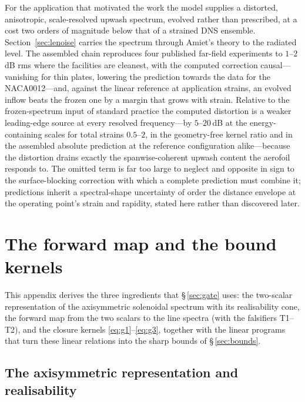 \documentclass[11pt,a4paper]{article}
\begin{document}
For the application that motivated the work the model supplies a
distorted, anisotropic, scale-resolved upwash spectrum, evolved rather than
prescribed, at a cost two orders of magnitude below that of a strained DNS
ensemble. Section~\ref{sec:lenoise} carries the spectrum through Amiet's
theory to the radiated level. The assembled chain reproduces four published far-field experiments to
$1$--$2$\,dB rms where the facilities are cleanest, with the computed
correction causal---vanishing for thin plates, lowering the
prediction towards the data for the NACA0012---and, against the linear
reference at application strains, an evolved inflow beats the frozen
one by a margin that grows with strain. Relative to the
frozen-spectrum input of standard practice the computed distortion is
a weaker leading-edge source at every resolved frequency---by
$5$--$20$\,dB at the energy-containing scales for total strains
$0.5$--$2$, in the geometry-free kernel ratio and in the assembled
absolute prediction at the reference configuration alike---because the
distortion drains exactly the spanwise-coherent upwash content the
aerofoil responds to. The omitted
term is far too large to neglect and opposite in sign to the
surface-blocking correction with which a complete prediction must
combine it; predictions inherit a spectral-shape uncertainty of order
the distance envelope at the operating point's strain and rapidity,
stated here rather than discovered later.

\appendix
\section{The forward map and the bound kernels}\label{app:forward}

This appendix derives the three ingredients that \S\,\ref{sec:gate} uses:
the two-scalar representation of the axisymmetric solenoidal spectrum with
its realisability cone, the forward map from the two scalars to the line
spectra (with the falsifiers T1--T2), and the closure kernels
\eqref{eq:g1}--\eqref{eq:g3}, together with the linear programs that turn
these linear relations into the sharp bounds of \S\,\ref{sec:bounds}.

\subsection{The axisymmetric representation and realisability}
\label{app:twoscalar}
\end{document}
